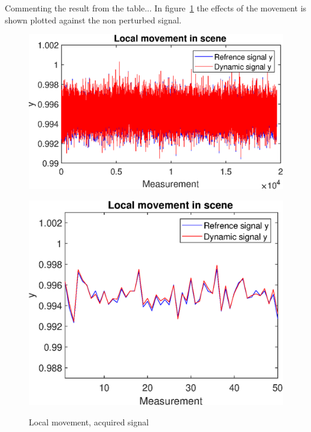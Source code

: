 Commenting the result from the table... In figure~\ref{fig:local_sig} the effects of the movement is shown plotted against the non perturbed signal.\\[0.1in]

\begin{figure}[H]
    \centering
\begin{minipage}[t]{0.495\textwidth}
    \includegraphics[width=1\textwidth]{result/dynamic/local/local_whole_time.eps}
    \label{fig:local_sig_1}
\end{minipage}
\begin{minipage}[t]{0.495\textwidth}
    \includegraphics[width = \textwidth]{result/dynamic/local/local_whole_time_win.eps}
    \label{fig:local_sig_2}
\end{minipage}
    \caption{Local movement, acquired signal}
    \label{fig:local_sig}
\end{figure}


